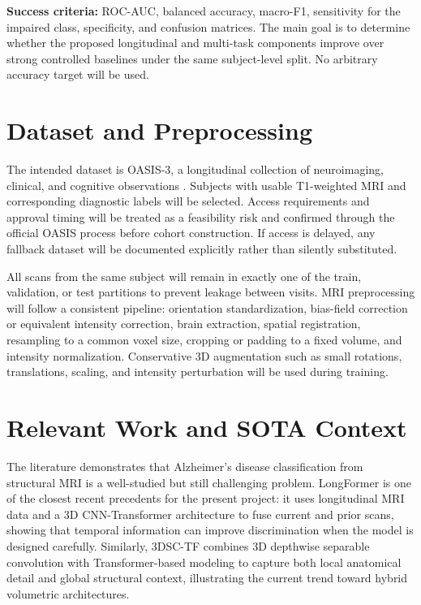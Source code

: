 \documentclass[11pt]{article}
\begin{document}
\textbf{Success criteria:} ROC-AUC, balanced accuracy, macro-F1, sensitivity for the impaired class, specificity, and confusion matrices. The main goal is to determine whether the proposed longitudinal and multi-task components improve over strong controlled baselines under the same subject-level split. No arbitrary accuracy target will be used.

\section{Dataset and Preprocessing}

The intended dataset is OASIS-3, a longitudinal collection of neuroimaging, clinical, and cognitive observations \cite{lamontagne2019}. Subjects with usable T1-weighted MRI and corresponding diagnostic labels will be selected. Access requirements and approval timing will be treated as a feasibility risk and confirmed through the official OASIS process before cohort construction. If access is delayed, any fallback dataset will be documented explicitly rather than silently substituted.

All scans from the same subject will remain in exactly one of the train, validation, or test partitions to prevent leakage between visits. MRI preprocessing will follow a consistent pipeline: orientation standardization, bias-field correction or equivalent intensity correction, brain extraction, spatial registration, resampling to a common voxel size, cropping or padding to a fixed volume, and intensity normalization. Conservative 3D augmentation such as small rotations, translations, scaling, and intensity perturbation will be used during training.

\section{Relevant Work and SOTA Context}

The literature demonstrates that Alzheimer's disease classification from structural MRI is a well-studied but still challenging problem. LongFormer \cite{chen2024longformer} is one of the closest recent precedents for the present project: it uses longitudinal MRI data and a 3D CNN-Transformer architecture to fuse current and prior scans, showing that temporal information can improve discrimination when the model is designed carefully. Similarly, 3DSC-TF \cite{qiang2025three} combines 3D depthwise separable convolution with Transformer-based modeling to capture both local anatomical detail and global structural context, illustrating the current trend toward hybrid volumetric architectures.
\end{document}
